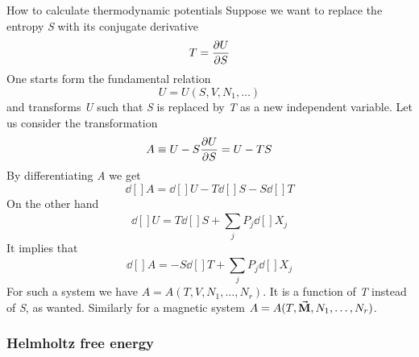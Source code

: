 \documentclass[../main/main.tex]{subfiles}
\begin{document}
\begin{example}{How to calculate thermodynamic potentials}{}
Suppose we want to replace the entropy \emph{S} with its conjugate derivative
\begin{equation*}
  T = \pdv{U}{S}
\end{equation*}
One starts form the fundamental relation
\begin{equation*}
  U=U(S,V,N_1,\dots)
\end{equation*}
and transforms \emph{U} such that \emph{S} is replaced by \emph{T} as a new independent variable. Let us consider the transformation
\begin{equation*}
  A \equiv U - S \pdv{U}{S} = U- T S
\end{equation*}
By differentiating \emph{A} we get
\begin{equation*}
  \dd[]{A} = \dd[]{U} - T \dd[]{S}  - S \dd[]{T}
\end{equation*}
On the other hand
\begin{equation*}
  \dd[]{U} = T \dd[]{S} + \sum_{j}^{} P_j \dd[]{X_j}
\end{equation*}
It implies that
\begin{equation*}
  \dd[]{A} = - S \dd[]{T} + \sum_{j}^{} P_j \dd[]{X_j}
\end{equation*}
For such a system we have \( A=A(T,V,N_1,\dots,N_r) \). It is a function of \emph{T} instead of \emph{S}, as wanted.  Similarly for a magnetic system \( A=A(T,\va{M},N_1,\dots,N_r ) \).
\end{example}

\subsubsection{Helmholtz free energy}
\end{document}
